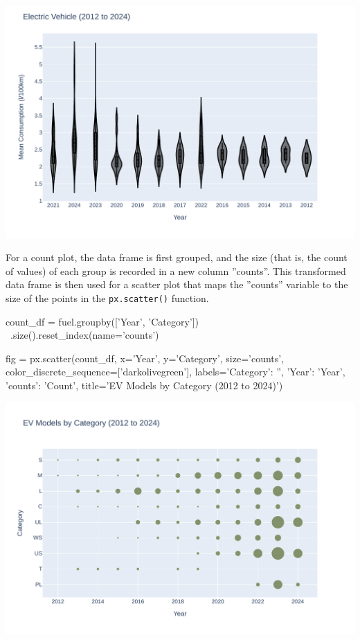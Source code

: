 \begin{center}
  \includegraphics[width=.8\textwidth]{px.fuel.violin.pdf}
\end{center}

For a count plot, the data frame is first grouped, and the size (that is, the count of values) of each group is recorded in a new column ''counts''. This transformed data frame is then used for a scatter plot that maps the ''counts'' variable to the size of the points in the \texttt{px.scatter()} function.

\begin{samepage}
\begin{pythoncode}
count_df = fuel.groupby(['Year', 'Category']) \
   .size().reset_index(name='counts')

fig = px.scatter(count_df, 
   x='Year', y='Category', size='counts',
   color_discrete_sequence=['darkolivegreen'],
   labels={'Category': '', 'Year': 'Year', 'counts': 'Count'},
   title='EV Models by Category (2012 to 2024)')
\end{pythoncode}
\end{samepage}

\begin{center}
  \includegraphics[width=.8\textwidth]{px.fuel.count.pdf}
\end{center}

